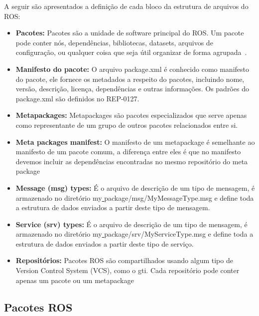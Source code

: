A seguir são apresentados a definição de cada bloco da estrutura de arquivos do ROS\@:
\begin{itemize}
    \item \textbf{Pacotes:} Pacotes são a unidade de software principal do ROS\@. Um pacote pode conter nós, dependências, bibliotecas, datasets, arquivos de configuração, ou qualquer coisa que seja útil organizar de forma agrupada~\cite{RosPKG}.

    \item \textbf{Manifesto do pacote:} O arquivo package.xml é conhecido como manifesto do pacote, ele fornece os metadados a respeito do pacotes, incluindo nome, versão, descrição, licença, dependências e outras informações. Os padrões do package.xml são definidos no REP-0127.
    
    \item \textbf{Metapackages:} Metapackages são pacotes especializados que serve apenas como representante de um grupo de outros pacotes relacionados entre si.
    
    \item \textbf{Meta packages manifest:} O manifesto de um metapackage é semelhante ao manifesto de um pacote comum, a diferença entre eles é que no manifesto devemos incluir as dependências encontradas no mesmo repositório do meta package
    
    \item \textbf{Message (msg) types:} É o arquivo de descrição de um tipo de mensagem, é armazenado no diretório my\underline{ }package/msg/MyMessageType.msg e define toda a estrutura de dados enviados a partir deste tipo de mensagem.
    
    \item \textbf{Service (srv) types:} É o arquivo de descrição de um tipo de mensagem, é armazenado no diretório my\underline{ }package/srv/MyServiceType.msg e define toda a estrutura de dados enviados a partir deste tipo de serviço.
    
    \item \textbf{Repositórios:} Pacotes ROS são compartilhados usando algum tipo de Version Control System (VCS), como o gti. Cada repositório pode conter apenas um pacote ou um metapackage 
\end{itemize}


\subsection{Pacotes ROS}

